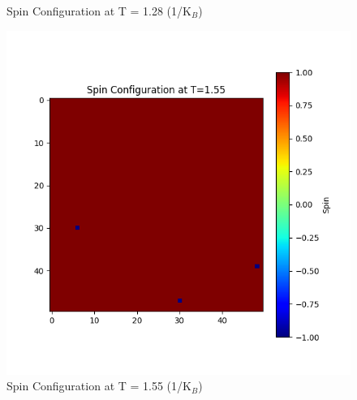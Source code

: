 \documentclass[11pt]{article}
\begin{document}
\begin{figure}[H]
\begin{minipage}{0.32\textwidth}
        \caption{Spin Configuration at T = 1.28 (1/K$_B$)}
        \label{fig:2}
    \end{minipage}
    \centering
    \begin{minipage}{0.32\textwidth}
        \centering
        \includegraphics[width=\textwidth]{Spin_Configuration_at_T=1.55.png}
        \caption{Spin Configuration at T = 1.55 (1/K$_B$)}
        \label{fig:3}
    \end{minipage}\hfill
\end{figure}
\end{document}
